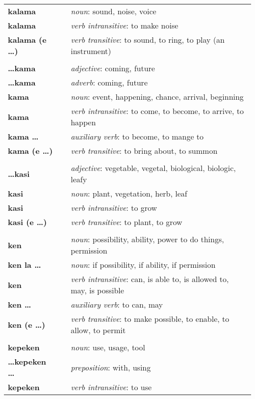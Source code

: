 \begin{supertabular}{p{2,5cm}|ll}
\textbf{kalama} && \textit{noun}: sound, noise, voice \\ 
\textbf{kalama} && \textit{verb intransitive}: to make noise \\ 
\textbf{kalama (e \dots)} && \textit{verb transitive}: to sound, to ring, to play (an instrument) \\ 
 && \\ %
\textbf{\dots kama} && \textit{adjective}: coming, future \\ 
\textbf{\dots kama} && \textit{adverb}: coming, future \\ 
\textbf{kama} && \textit{noun}: event, happening, chance, arrival, beginning \\ 
\textbf{kama} && \textit{verb intransitive}: to come, to become, to arrive, to happen \\ 
\textbf{kama \dots} && \textit{auxiliary verb}: to become, to mange to \\ 
\textbf{kama (e \dots)} && \textit{verb transitive}: to bring about, to summon \\ 
 && \\ %
\textbf{\dots kasi} && \textit{adjective}: vegetable, vegetal, biological, biologic, leafy \\ 
\textbf{kasi} && \textit{noun}: plant, vegetation, herb, leaf \\ 
\textbf{kasi} && \textit{verb intransitive}: to grow \\ 
\textbf{kasi (e \dots)} && \textit{verb transitive}: to plant, to grow \\ 
 && \\ %
\textbf{ken} && \textit{noun}: possibility, ability, power to do things, permission \\ 
\textbf{ken la \dots} && \textit{noun}: if possibility, if ability, if permission \\ 
\textbf{ken} && \textit{verb intransitive}: can, is able to, is allowed to, may, is possible \\ 
\textbf{ken \dots} && \textit{auxiliary verb}: to can, may \\ 
\textbf{ken (e \dots)} && \textit{verb transitive}: to make possible, to enable, to allow, to permit \\ 
 && \\ %
\textbf{kepeken} && \textit{noun}: use, usage, tool \\ 
\textbf{\dots kepeken \dots} && \textit{preposition}: with, using \\ 
\textbf{kepeken} && \textit{verb intransitive}: to use \\ 

\end{supertabular}
